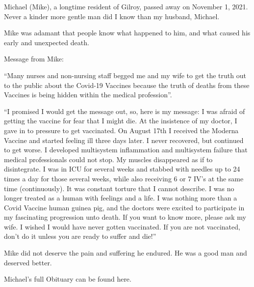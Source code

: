 Michael (Mike), a longtime resident of Gilroy, passed away on November 1,
2021. Never a kinder more gentle man did I know than my husband, Michael.

Mike was adamant that people know what happened to him, and what caused his
early and unexpected death.

Message from Mike:

“Many nurses and non-nursing staff begged me and my wife to get the truth out to
the public about the Covid-19 Vaccines because the truth of deaths from these
Vaccines is being hidden within the medical profession”.

“I promised I would get the message out, so, here is my message: I was afraid of
getting the vaccine for fear that I might die. At the insistence of my doctor, I
gave in to pressure to get vaccinated. On August 17th I received the Moderna
Vaccine and started feeling ill three days later. I never recovered, but
continued to get worse. I developed multisystem inflammation and multisystem
failure that medical professionals could not stop. My muscles disappeared as if
to disintegrate. I was in ICU for several weeks and stabbed with needles up to
24 times a day for those several weeks, while also receiving 6 or 7 IV’s at the
same time (continuously). It was constant torture that I cannot describe. I was
no longer treated as a human with feelings and a life. I was nothing more than a
Covid Vaccine human guinea pig, and the doctors were excited to participate in
my fascinating progression unto death. If you want to know more, please ask my
wife. I wished I would have never gotten vaccinated. If you are not vaccinated,
don’t do it unless you are ready to suffer and die!”

Mike did not deserve the pain and suffering he endured. He was a good man and
deserved better.

Michael’s full Obituary can be found here.
